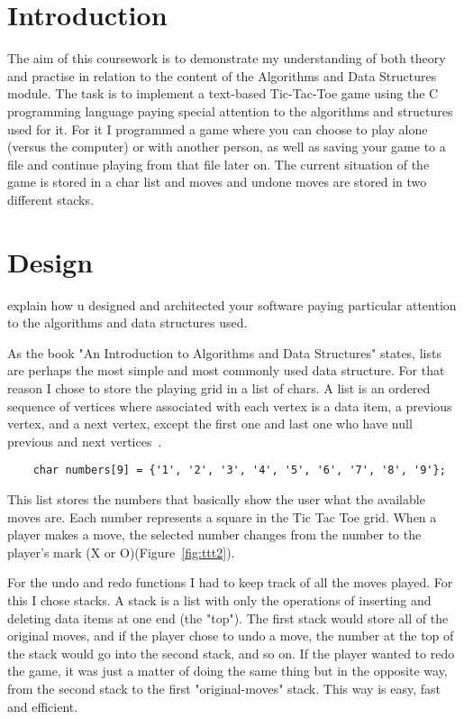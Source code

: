 \documentclass[10pt, a4paper]{article}
\title{\mytitle}
\author{\myauthor\hspace{1em}\\\contact\\Edinburgh Napier University\hspace{0.5em}-\hspace{0.5em}\mymodule}
\date{}
\begin{document}
    \maketitle

    \section{Introduction}

The aim of this coursework is to demonstrate my understanding of both theory and practise in relation to the content of the Algorithms and Data Structures module. The task is to implement a text-based Tic-Tac-Toe game using the C programming language paying special attention to the algorithms and structures used for it. For it I programmed a game where you can choose to play alone (versus the computer) or with another person, as well as saving your game to a file and continue playing from that file later on. The current situation of the game is stored in a char list and  moves and undone moves are stored in two different stacks.

	\section{Design}
explain how u designed and architected your software paying particular attention to the algorithms and data structures used.

As the book "An Introduction to Algorithms and Data Structures" states, lists are perhaps the most simple and most commonly used data structure. For that reason I chose to store the playing grid in a list of chars. A list is an ordered sequence of vertices where associated with each vertex is a data item, a previous vertex, and a next vertex, except the first one and last one who have null previous and next vertices~\cite{storer_2013}.

\begin{lstlisting}
    char numbers[9] = {'1', '2', '3', '4', '5', '6', '7', '8', '9'};
\end{lstlisting}

This list stores the numbers that basically show the user what the available moves are. Each number represents a square in the Tic Tac Toe grid. When a player makes a move, the selected number changes from the number to the player's mark (X or O)(Figure~\ref{fig:ttt2}).



For the undo and redo functions I had to keep track of all the moves played. For this I chose stacks. A stack is a list with only the operations of inserting and deleting data items at one end (the "top"). The first stack would store all of the original moves, and if the player chose to undo a move, the number at the top of the stack would go into the second stack, and so on. If the player wanted to redo the game, it was just a matter of doing the same thing but in the opposite way, from the second stack to the first "original-moves" stack. This way is easy, fast and efficient.
\end{document}
